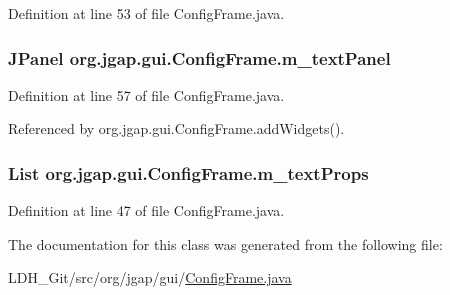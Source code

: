 Definition at line 53 of file Config\-Frame.\-java.

\hypertarget{classorg_1_1jgap_1_1gui_1_1_config_frame_af1777986f345ff87ee09f6202590ecd7}{
\subsubsection[{m\-\_\-text\-Panel}]{\setlength{\rightskip}{0pt plus 5cm}J\-Panel org.\-jgap.\-gui.\-Config\-Frame.\-m\-\_\-text\-Panel\hspace{0.3cm}{\ttfamily [private]}}}\label{classorg_1_1jgap_1_1gui_1_1_config_frame_af1777986f345ff87ee09f6202590ecd7}


Definition at line 57 of file Config\-Frame.\-java.



Referenced by org.\-jgap.\-gui.\-Config\-Frame.\-add\-Widgets().

\hypertarget{classorg_1_1jgap_1_1gui_1_1_config_frame_a4f9867cc6c7504fdd9962cce88055a8c}{
\subsubsection[{m\-\_\-text\-Props}]{\setlength{\rightskip}{0pt plus 5cm}List org.\-jgap.\-gui.\-Config\-Frame.\-m\-\_\-text\-Props\hspace{0.3cm}{\ttfamily [private]}}}\label{classorg_1_1jgap_1_1gui_1_1_config_frame_a4f9867cc6c7504fdd9962cce88055a8c}


Definition at line 47 of file Config\-Frame.\-java.



The documentation for this class was generated from the following file\-:\begin{DoxyCompactItemize}
\item 
L\-D\-H\-\_\-\-Git/src/org/jgap/gui/\hyperlink{_config_frame_8java}{Config\-Frame.\-java}\end{DoxyCompactItemize}
